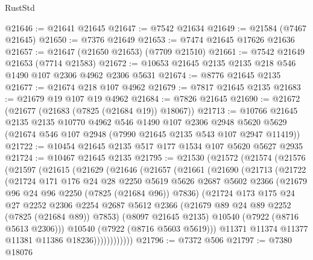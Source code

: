 \begin{lexlean}{RustStd}
\begin{coremodule}
@21646 := @21641 @21645
@21647 := @7542 @21634
@21649 := @21584 (@7467 @21645)
@21650 := @7376 @21649
@21653 := @7474 @21645 @17626 @21636
@21657 := @21647 (@21650 @21653) (@7709 @21510)
@21661 := @7542 @21649 @21653 (@7714 @21583)
@21672 := @10653 @21645 @2135 @2135 @218 @546 @1490 @107 @2306 @4962 @2306 @5631
@21674 := @8776 @21645 @2135
@21677 := @21674 @218 @107 @4962
@21679 := @7817 @21645 @2135
@21683 := @21679 @19 @107 @19 @4962
@21684 := @7826 @21645
@21690 := @21672 (@21677 (@21683 (@7825 (@21684 @19)) @18067))
@21713 := @10766
    @21645
    @2135
    @2135
    @10770
    @4962
    @546
    @1490
    @107
    @2306
    @2948
    @5620
    @5629
    (@21674 @546 @107 @2948 (@7990 @21645 @2135 @543 @107 @2947 @11419))
@21722 := @10454 @21645 @2135 @517 @177 @1534 @107 @5620 @5627 @2935
@21724 := @10467 @21645 @2135
@21795 := @21530
    (@21572
      (@21574
        (@21576
          (@21597
            (@21615
              (@21629
                (@21646
                  (@21657
                    (@21661
                      (@21690
                        (@21713
                          (@21722
                            (@21724
                              @171
                              @176
                              @24
                              @28
                              @2250
                              @5619
                              @5626
                              @2687
                              @5602
                              @2366
                              (@21679 @96 @24 @96 @2250 (@7825 (@21684 @96)) @7836)
                              (@21724
                                @173
                                @175
                                @24
                                @27
                                @2252
                                @2306
                                @2254
                                @2687
                                @5612
                                @2366
                                (@21679 @89 @24 @89 @2252 (@7825 (@21684 @89)) @7853)
                                (@8097 @21645 @2135)
                                @10540
                                (@7922 (@8716 @5613 @2306)))
                              @10540
                              (@7922 (@8716 @5603 @5619)))
                            @11371
                            @11374
                            @11377
                            @11381
                            @11386
                            @18236))))))))))))
@21796 := @7372 @506
@21797 := @7380 @18076

\end{coremodule}
\end{lexlean}
